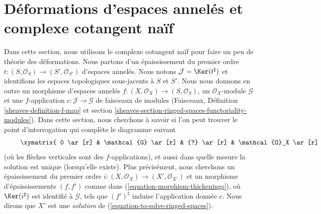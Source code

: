 \section{Déformations d'espaces annelés et complexe cotangent naïf}
\label{section-deformations-ringed-spaces}

\noindent
Dans cette section, nous utilisons le complexe cotangent naïf pour faire un peu
de théorie des déformations. Nous partons d'un épaississement du premier ordre
$t : (S, \mathcal{O}_S) \to (S', \mathcal{O}_{S'})$ d'espaces annelés.
Nous notons $\mathcal{J} = \Ker(t^\sharp)$ et identifions les espaces
topologiques sous-jacents à $S$ et $S'$.
Nous nous donnons en outre un morphisme d'espaces annelés
$f : (X, \mathcal{O}_X) \to (S, \mathcal{O}_S)$, un $\mathcal{O}_X$-module
$\mathcal{G}$ et une $f$-application $c : \mathcal{J} \to \mathcal{G}$
de faisceaux de modules (Faisceaux, Définition
\ref{sheaves-definition-f-map} et section
\ref{sheaves-section-ringed-spaces-functoriality-modules}).
Dans cette section, nous cherchons à savoir si l'on peut trouver
le point d'interrogation qui complète le diagramme suivant
\begin{equation}
\label{equation-to-solve-ringed-spaces}
\vcenter{
\xymatrix{
0 \ar[r] & \mathcal{G} \ar[r] & {?} \ar[r] & \mathcal{O}_X \ar[r] & 0 \\
0 \ar[r] & \mathcal{J} \ar[u]^c \ar[r] & \mathcal{O}_{S'} \ar[u] \ar[r] &
\mathcal{O}_S \ar[u] \ar[r] & 0
}
}
\end{equation}
(où les flèches verticales sont des $f$-applications), et aussi dans quelle
mesure la solution est unique (lorsqu'elle existe). Plus précisément,
nous cherchons un épaississement du premier ordre
$i : (X, \mathcal{O}_X) \to (X', \mathcal{O}_{X'})$
et un morphisme d'épaississements $(f, f')$ comme dans
(\ref{equation-morphism-thickenings}), où $\Ker(i^\sharp)$ est identifié
à $\mathcal{G}$, tels que $(f')^\sharp$ induise l'application donnée $c$.
Nous dirons que $X'$ est une {\it solution} de
(\ref{equation-to-solve-ringed-spaces}).

